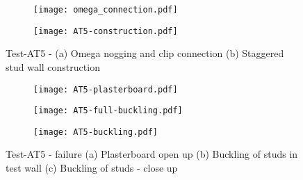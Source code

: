 \begin{figure}[!htbp]
	\centering
	\begin{subfigure}[b]{0.5\textwidth}
		\centering
		\texttt{[image: omega\_connection.pdf]}
		\caption{}
		\label{subfig:omega_connection}
	\end{subfigure}
	\begin{subfigure}[b]{0.8\textwidth}
		\centering
		\texttt{[image: AT5-construction.pdf]}
		\caption{}
		\label{subfig:AT5-wall-construction}
	\end{subfigure}
	   \caption{Test-AT5 - (a) Omega nogging and clip connection (b) Staggered stud wall construction}
	   \label{fig:AT5-construction}
\end{figure}
\begin{figure}[!htbp]
	\centering
	\begin{subfigure}[b]{0.4\textwidth}
		\centering
		\texttt{[image: AT5-plasterboard.pdf]}
		\caption{}
		\label{subfig:AT5-full-buckling}
	\end{subfigure}
	\begin{subfigure}[b]{0.5\textwidth}
		\centering
		\texttt{[image: AT5-full-buckling.pdf]}
		\caption{}
		\label{subfig:AT5-plasterboard}
	\end{subfigure}
	\begin{subfigure}[b]{0.45\textwidth}
		\centering
		\texttt{[image: AT5-buckling.pdf]}
		\caption{}
		\label{subfig:AT5-buckling}
	\end{subfigure}
	   \caption{Test-AT5 - failure (a) Plasterboard open up  (b) Buckling of studs in test wall (c) Buckling of studs - close up }
	   \label{fig:AT5-failure}
\end{figure}
